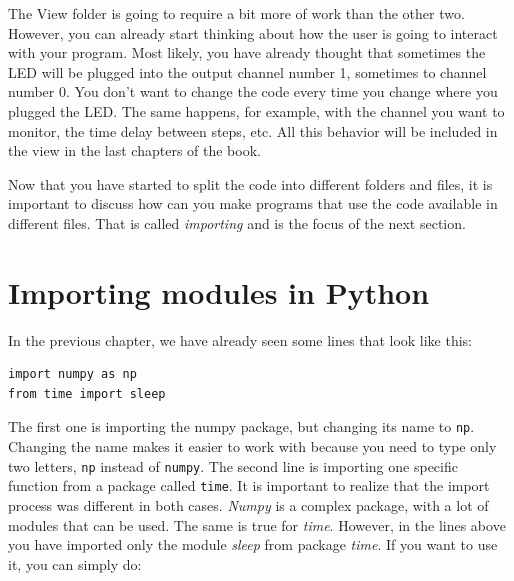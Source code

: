
The View folder is going to require a bit more of work than the other two. However, you can already start thinking about how the user is going
to interact with your program. Most likely, you have already thought that sometimes the {LED} will be plugged into the output channel number 1,
sometimes to channel number 0. You don't want to change the code every time you change where you plugged the LED. The same happens, for example, with the channel you want to monitor, the time delay between steps, etc. All this behavior will be included in the view in the last chapters of the book. 

Now that you have started to split the code into different folders and files, it is important to discuss how can you make programs that use the code available in different files. That is called \emph{importing} and is the focus of the next section. 

\section{Importing modules in Python}\label{section:importing-python}
In the previous chapter, we have already seen some lines that look like this:

\begin{verbatim}
import numpy as np
from time import sleep
\end{verbatim}

The first one is importing the numpy package, but changing its name to \texttt{np}. Changing the name makes it easier to work with because you need to type only two letters, \texttt{np} instead of \texttt{numpy}. The second line is importing one specific function from a package called \texttt{time}. It is important to realize that the import process was different in both cases. \emph{Numpy} is a complex package, with a lot of modules that can be used. The same is true for \emph{time}. However, in the lines above you have imported only the module \emph{sleep} from package \emph{time}. If you want to use it, you can simply do:


